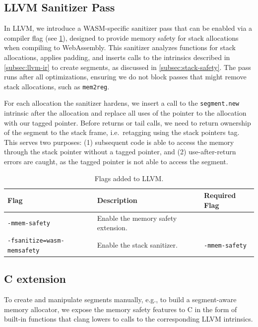 \subsection{LLVM Sanitizer Pass}
\label{subsec:llvm-sanitizer-pass}

In LLVM, we introduce a \ac{WASM}-specific sanitizer pass that can be enabled via a compiler flag (see \cref{tab:llvm-flags}), designed to provide memory safety for stack allocations when compiling to WebAssembly.
This sanitizer analyzes functions for stack allocations, applies padding, and inserts calls to the intrinsics described in \cref{subsec:llvm-ir} to create segments, as discussed in \cref{subsec:stack-safety}.
The pass runs after all optimizations, ensuring we do not block passes that might remove stack allocations, such as \texttt{mem2reg}.

For each allocation the sanitizer hardens, we insert a call to the \texttt{segment.new} intrinsic after the allocation and replace all uses of the pointer to the allocation with our tagged pointer.
Before returns or tail calls, we need to return ownership of the segment to the stack frame, i.e.\ retagging using the stack pointers tag.
This serves two purposes: (1) subsequent code is able to access the memory through the stack pointer without a tagged pointer, and (2) use-after-return errors are caught, as the tagged pointer is not able to access the segment.

\begin{table}[t]
  \centering
  \begin{tabular}{l | l | l}
    \textbf{Flag} & \textbf{Description} & \textbf{Required Flag} \\
    \hline
    \texttt{-mmem-safety}              & Enable the memory safety extension. & \\
    \texttt{-fsanitize=wasm-memsafety} & Enable the stack sanitizer. & \texttt{-mmem-safety} \\
  \end{tabular}
  \caption{Flags added to LLVM.}
  \label{tab:llvm-flags}
\end{table}

\subsection{C extension}
\label{subsec:c-extension}

To create and manipulate segments manually, e.g., to build a segment-aware memory allocator, we expose the memory safety features to C in the form of built-in functions that clang lowers to calls to the corresponding LLVM intrinsics.

